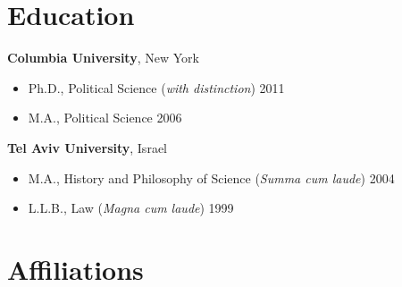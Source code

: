 \documentclass[10pt,a4paper]{article}
\begin{document}
\section{Education}

\textbf{Columbia University}, New York
\begin{itemize}[leftmargin=1em, itemsep=1pt, topsep=2pt]
    \item[] Ph.D., Political Science (\textit{with distinction}) \hfill \textcolor{secondary}{2011}
    \item[] M.A., Political Science \hfill \textcolor{secondary}{2006}
\end{itemize}

\vspace{4pt}
\textbf{Tel Aviv University}, Israel
\begin{itemize}[leftmargin=1em, itemsep=1pt, topsep=2pt]
    \item[] M.A., History and Philosophy of Science (\textit{Summa cum laude}) \hfill \textcolor{secondary}{2004}
    \item[] L.L.B., Law (\textit{Magna cum laude}) \hfill \textcolor{secondary}{1999}
\end{itemize}

\section{Affiliations}
\end{document}
